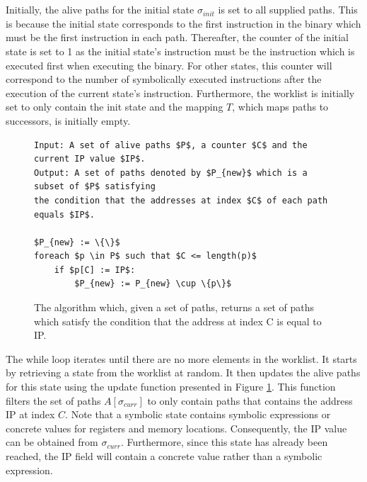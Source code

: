 \documentclass{kththesis}
\begin{document}
\\ \\
Initially, the alive paths for the initial state $\sigma_{init}$ is set to all supplied paths. This is because the initial state corresponds to the first instruction in the binary which must be the first instruction in each path. Thereafter, the counter of the initial state is set to 1 as the initial state's instruction must be the instruction which is executed first when executing the binary. For other states, this counter will correspond to the number of symbolically executed instructions after the execution of the current state's instruction. Furthermore, the worklist is initially set to only contain the init state and the mapping $T$, which maps paths to successors, is initially empty.
\clearpage
\begin{figure}[!htbp]
    \centering
\begin{algorithmFrame}
\begin{lstlisting}[style=algorithm]
Input: A set of alive paths $P$, a counter $C$ and the current IP value $IP$. 
Output: A set of paths denoted by $P_{new}$ which is a subset of $P$ satisfying
the condition that the addresses at index $C$ of each path equals $IP$.

$P_{new} := \{\}$
foreach $p \in P$ such that $C <= length(p)$
    if $p[C] := IP$:
        $P_{new} := P_{new} \cup \{p\}$
\end{lstlisting}
\end{algorithmFrame}
\caption[The algorithm which, given a set of paths, returns a set of paths which satisfy the condition that the address at index C is equal to IP.]{The algorithm which, given a set of paths, returns a set of paths which satisfy the condition that the address at index C is equal to IP.}
    \label{fig:DSEupdate}
\end{figure}
\noindent
The while loop iterates until there are no more elements in the worklist. It starts by retrieving a state from the worklist at random. It then updates the alive paths for this state using the update function presented in Figure \ref{fig:DSEupdate}. This function filters the set of paths $A[\sigma_{curr}]$ to only contain paths that contains the address IP at index $C$. Note that a symbolic state contains symbolic expressions or concrete values for registers and memory locations. Consequently, the IP value can be obtained from $\sigma_{curr}$. Furthermore, since this state has already been reached, the IP field will contain a concrete value rather than a symbolic expression.
\end{document}
